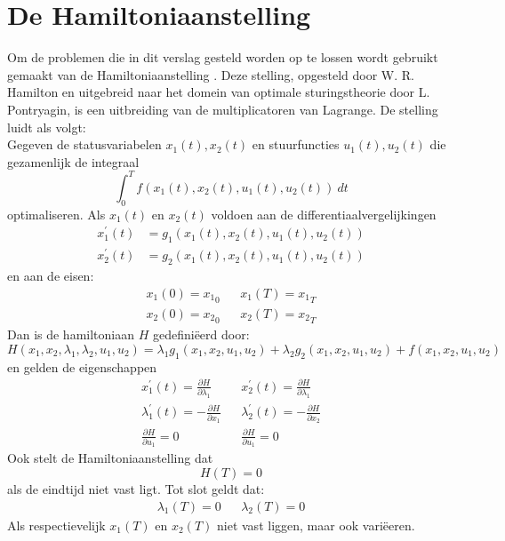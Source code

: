 \chapter{De Hamiltoniaanstelling}
Om de problemen die in dit verslag gesteld worden op te lossen wordt gebruikt gemaakt van de Hamiltoniaanstelling \cite{hamiltonian}. Deze stelling, opgesteld door W. R. Hamilton en uitgebreid naar het domein van optimale sturingstheorie door L. Pontryagin, is een uitbreiding van de multiplicatoren van Lagrange. De stelling luidt als volgt:\\
Gegeven de statusvariabelen \(x_1(t),x_2(t)\) en stuurfuncties \(u_1(t),u_2(t)\) die gezamenlijk de integraal
\begin{equation*}
\int_0^T f(x_1(t),x_2(t),u_1(t),u_2(t))~dt
\end{equation*}
optimaliseren. Als \(x_1(t)\) en \(x_2(t)\) voldoen aan de differentiaalvergelijkingen
\begin{align*}
	x_1^\prime(t) &= g_1(x_1(t),x_2(t),u_1(t),u_2(t))\\
	x_2^\prime(t) &= g_2(x_1(t),x_2(t),u_1(t),u_2(t))
\end{align*}
en aan de eisen: 
\begin{align*}
	x_1(0) = {x_1}_0 && x_1(T) = {x_1}_T\\
	x_2(0) = {x_2}_0 && x_2(T) = {x_2}_T
\end{align*}
Dan is de hamiltoniaan \(H\) gedefini\"eerd door:
\begin{equation*}
H(x_1,x_2,\lambda_1,\lambda_2,u_1,u_2)= \lambda_1 g_1(x_1,x_2,u_1,u_2) +\lambda_2g_2(x_1,x_2,u_1,u_2)+ f(x_1,x_2,u_1,u_2)
\end{equation*}
en gelden de eigenschappen
\begin{align}
	x_1^\prime(t) = \frac{\partial H}{\partial\lambda_1} && x_2^\prime(t) = \frac{\partial H}{\partial\lambda_1}\\
	\lambda_1^\prime(t) = -\frac{\partial H}{\partial x_1} && \lambda_2^\prime(t) = -\frac{\partial H}{\partial x_2}\\
	\frac{\partial H}{\partial u_1} = 0 && \frac{\partial H}{\partial u_1} = 0
\end{align}
Ook stelt de Hamiltoniaanstelling dat
\begin{equation*}
	H(T) = 0
\end{equation*}
als de eindtijd niet vast ligt.
Tot slot geldt dat: 
\begin{align*}
	\lambda_1(T) =0 && \lambda_2(T) = 0
\end{align*}
Als respectievelijk \(x_1(T)\) en \(x_2(T)\) niet vast liggen, maar ook vari\"eeren. 

